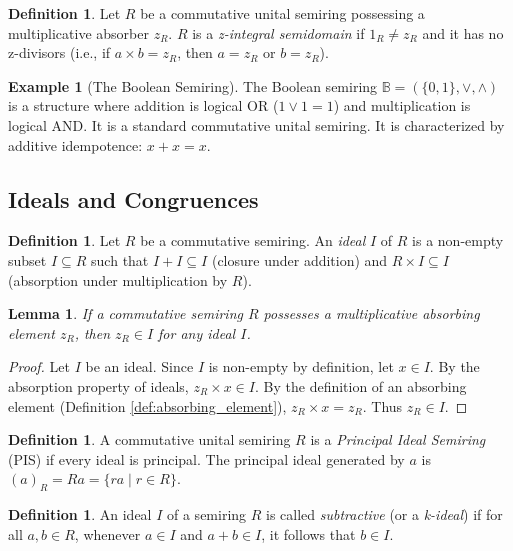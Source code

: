 \documentclass[11pt, a4paper]{article}
\theoremstyle{plain}
\newtheorem{lemma}[theorem]{Lemma}
\theoremstyle{definition}
\newtheorem{definition}[theorem]{Definition}
\newtheorem{example}[theorem]{Example}
\numberwithin{equation}{section}
\newcommand{\Bool}{\mathbb{B}} %
\begin{document}
\begin{definition}\label{def:z_integral_semidomain}
Let $R$ be a commutative unital semiring possessing a multiplicative absorber $z_R$. $R$ is a \emph{z-integral semidomain} if $1_R \neq z_R$ and it has no z-divisors (i.e., if $a\times b = z_R$, then $a=z_R$ or $b=z_R$).
\end{definition}

\begin{example}[The Boolean Semiring]\label{ex:boolean_semiring}
The Boolean semiring $\Bool=(\{0, 1\}, \lor, \wedge)$ is a structure where addition is logical OR ($1\lor 1=1$) and multiplication is logical AND. It is a standard commutative unital semiring. It is characterized by additive idempotence: $x+x=x$.
\end{example}

\subsection{Ideals and Congruences}

\begin{definition}\label{def:ideal}
Let $R$ be a commutative semiring. An \emph{ideal} $I$ of $R$ is a non-empty subset $I \subseteq R$ such that $I+I \subseteq I$ (closure under addition) and $R\times I \subseteq I$ (absorption under multiplication by $R$).
\end{definition}

\begin{lemma}\label{lem:absorber_in_ideal}
If a commutative semiring $R$ possesses a multiplicative absorbing element $z_R$, then $z_R \in I$ for any ideal $I$.
\end{lemma}
\begin{proof}
Let $I$ be an ideal. Since $I$ is non-empty by definition, let $x \in I$. By the absorption property of ideals, $z_R\times x \in I$. By the definition of an absorbing element (Definition \ref{def:absorbing_element}), $z_R \times x = z_R$. Thus $z_R \in I$.
\end{proof}

\begin{definition}\label{def:PIS}
A commutative unital semiring $R$ is a \emph{Principal Ideal Semiring} (PIS) if every ideal is principal. The principal ideal generated by $a$ is $(a)_R = Ra = \{ra \mid r \in R\}$.
\end{definition}

\begin{definition}\label{def:subtractive_ideal}
An ideal $I$ of a semiring $R$ is called \emph{subtractive} (or a \emph{k-ideal}) if for all $a, b \in R$, whenever $a \in I$ and $a+b \in I$, it follows that $b \in I$.
\end{definition}
\end{document}

